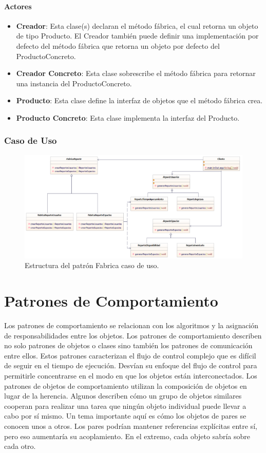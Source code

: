 \paragraph{Actores}

\begin{itemize}
	\item \textbf{Creador}: Esta clase(s) declaran el método fábrica, el cual retorna un objeto de tipo Producto. El Creador también puede definir una implementación por defecto del método fábrica que retorna un objeto por defecto del ProductoConcreto.
	\item \textbf{Creador Concreto}: Esta clase sobrescribe el método fábrica para retornar una instancia del ProductoConcreto.
	\item \textbf{Producto}: Esta clase define la interfaz de objetos que el método fábrica crea.
	\item \textbf{Producto Concreto}: Esta clase implementa la interfaz del Producto.	
\end{itemize}

\subsubsection{Caso de Uso}
\begin{figure}[th!]
	\centering
	\includegraphics[width=.7\linewidth]{imagenes/Patrones/Builder_caso.pdf}
	\caption{Estructura del patrón Fabrica caso de uso.\cite{gof}}	
\end{figure}



\section{Patrones de Comportamiento}
Los patrones de comportamiento se relacionan con los algoritmos y la asignación de responsabilidades entre los objetos. Los patrones de comportamiento describen no solo patrones de objetos o clases sino también los patrones de comunicación entre ellos. Estos patrones caracterizan el flujo de control complejo que es difícil de seguir en el tiempo de ejecución. Desvían su enfoque del flujo de control para permitirle concentrarse en el modo en que los objetos están interconectados. Los patrones de objetos de comportamiento utilizan la composición de objetos en lugar de la herencia. Algunos describen cómo un grupo de objetos similares cooperan para realizar una tarea que ningún objeto individual puede llevar a cabo por sí mismo. Un tema importante aquí es cómo los objetos de pares se conocen unos a otros. Los pares podrían mantener referencias explícitas entre sí, pero eso aumentaría su acoplamiento. En el extremo, cada objeto sabría sobre cada otro.\cite{gof}
